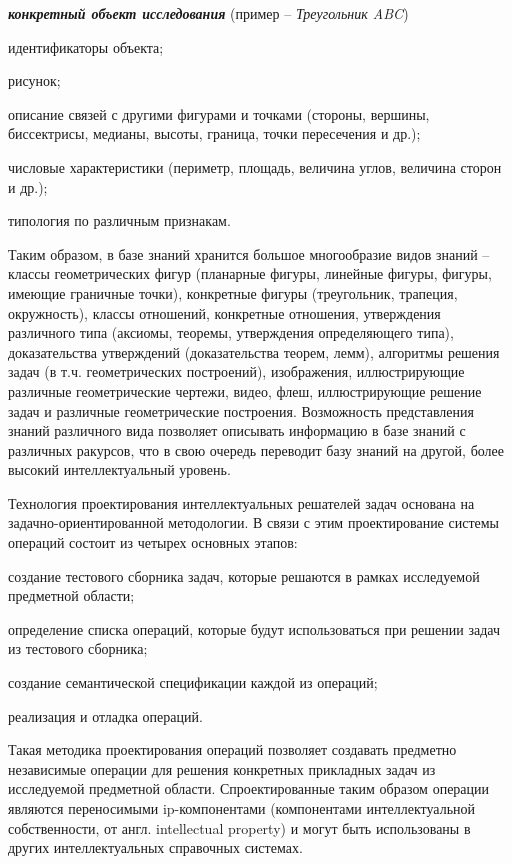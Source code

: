 \textbf{\textit{конкретный объект исследования}} (пример -- \textit{Треугольник ABC})

\begin{textitemize}
	\item идентификаторы объекта;
	\item рисунок;
	\item описание связей с другими фигурами и точками (стороны, вершины, биссектрисы, медианы, высоты, граница, точки пересечения и др.);
	\item числовые характеристики (периметр, площадь, величина углов, величина сторон и др.);
	\item типология по различным признакам.
\end{textitemize}

Таким образом, в базе знаний хранится большое многообразие видов знаний -- классы геометрических фигур (планарные фигуры, линейные фигуры, фигуры, имеющие граничные точки), конкретные фигуры (треугольник, трапеция, окружность), классы отношений, конкретные отношения, утверждения различного типа (аксиомы, теоремы, утверждения определяющего типа), доказательства утверждений (доказательства теорем, лемм), алгоритмы решения задач (в т.ч. геометрических построений), изображения, иллюстрирующие различные геометрические чертежи, видео, флеш, иллюстрирующие решение задач и различные геометрические построения. Возможность представления знаний различного вида позволяет описывать информацию в базе знаний с различных ракурсов, что в свою очередь переводит базу знаний на другой, более высокий интеллектуальный уровень.

Технология проектирования интеллектуальных решателей задач основана на задачно-ориентированной методологии. В связи с этим проектирование системы операций состоит из четырех основных этапов:

\begin{textitemize}
	\item создание тестового сборника задач, которые решаются в рамках исследуемой предметной области;
	\item определение списка операций, которые будут использоваться при решении задач из тестового сборника;
	\item создание семантической спецификации каждой из операций;
	\item реализация и отладка операций.
\end{textitemize}

Такая методика проектирования операций позволяет создавать предметно независимые операции для решения конкретных прикладных задач из исследуемой предметной области. Спроектированные таким образом операции являются переносимыми ip-компонентами (компонентами интеллектуальной собственности, от англ. intellectual property) и могут быть использованы в других интеллектуальных справочных системах.

